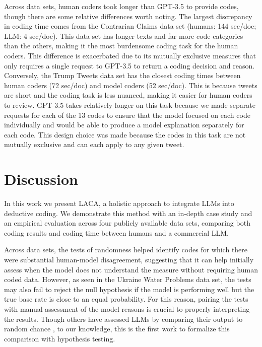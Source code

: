 \documentclass{article}
\begin{document}
Across data sets, human coders took longer than GPT-3.5 to provide codes, though there are some relative differences worth noting.  The largest discrepancy in coding time comes from the Contrarian Claims data set (humans: 144 sec/doc; LLM: 4 sec/doc). This data set has longer texts and far more code categories than the others, making it the most burdensome coding task for the human coders.  This difference is exacerbated due to its mutually exclusive measures that only requires a single request to GPT-3.5 to return a coding decision and reason.  Conversely, the Trump Tweets data set has the closest coding times between human coders (72 sec/doc) and model coders (52 sec/doc).  This is because tweets are short and the coding task is less nuanced, making it easier for human coders to review.  GPT-3.5 takes relatively longer on this task because we made separate requests for each of the 13 codes to ensure that the model focused on each code individually and would be able to produce a model explanation separately for each code. This design choice was made because the codes in this task are not mutually exclusive and can each apply to any given tweet.

\section{Discussion}
\label{sec:discuss}
In this work we present LACA, a holistic approach to integrate LLMs into deductive coding.  We demonstrate this method with an in-depth case study and an empirical evaluation across four publicly available data sets, comparing both coding results and coding time between humans and a commercial LLM. 

Across data sets, the tests of randomness helped identify codes for which there were substantial human-model disagreement, suggesting that it can help initially assess when the model does not understand the measure without requiring human coded data.  However, as seen in the Ukraine Water Problems data set, the tests may also fail to reject the null hypothesis if the model is performing well but the true base rate is close to an equal probability. For this reason, pairing the tests with manual assessment of the model reasons is crucial to properly interpreting the results. Though others have assessed LLMs by comparing their output to random chance \cite{ruis_large_2022,wei_emergent_2022}, to our knowledge, this is the first work to formalize this comparison with hypothesis testing.  
\end{document}
